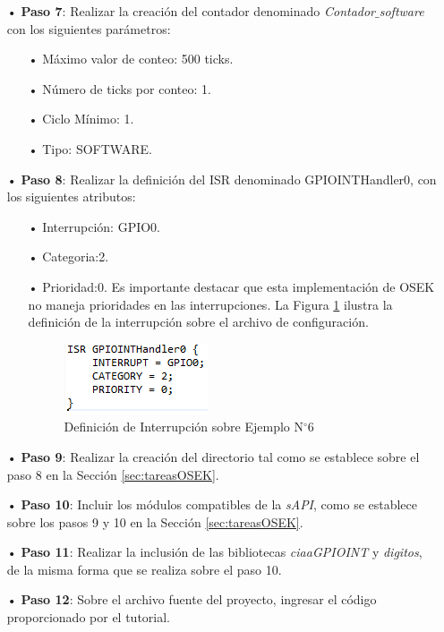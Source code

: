 \documentclass[12pt,letterpaper]{article}
\begin{document}
\begin{enumerate}
\item[•]\textbf{Paso 7}: Realizar la creación del contador denominado \textit{Contador$\_$software} con los siguientes parámetros:
\begin{enumerate}
\item[•]Máximo valor de conteo: 500 ticks.
\item[•]Número de ticks por conteo: 1. 
\item[•]Ciclo Mínimo: 1.
\item[•]Tipo: SOFTWARE.
\end{enumerate}

\item[•]\textbf{Paso 8}: Realizar la definición del ISR denominado GPIOINTHandler0, con los siguientes atributos:
\begin{enumerate}
\item[•]Interrupción: GPIO0.
\item[•]Categoria:2.
\item[•]Prioridad:0. Es importante destacar que esta implementación de OSEK no maneja prioridades en las interrupciones. La Figura \ref{defintej6} ilustra la definición de la interrupción sobre el archivo de configuración.
\begin{figure}[H]
\centering
\includegraphics[width=5 cm]{figuras/f34.png}
\caption{Definición de Interrupción sobre Ejemplo N$^{\circ}$6}
\label{defintej6}
\end{figure}
\end{enumerate}
\item[•]\textbf{Paso 9}: Realizar la creación del directorio tal como se establece sobre el paso 8 en la Sección \ref{sec:tareasOSEK}.
\item[•]\textbf{Paso 10}: Incluir los módulos compatibles de la \textit{sAPI}, como se establece sobre los pasos 9 y 10 en la Sección \ref{sec:tareasOSEK}.
\item[•]\textbf{Paso 11}: Realizar la inclusión de las bibliotecas \textit{ciaaGPIOINT} y \textit{digitos}, de la misma forma que se realiza sobre el paso 10.
\item[•]\textbf{Paso 12}: Sobre el archivo fuente del proyecto, ingresar el código proporcionado por el tutorial.

\end{enumerate}
\end{document}
